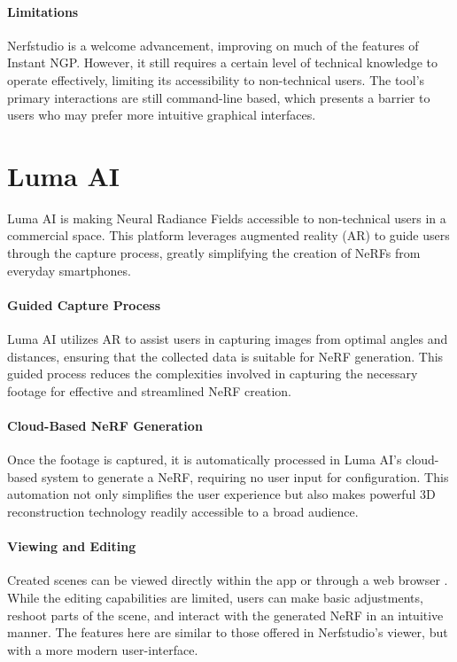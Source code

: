 \paragraph{Limitations}
Nerfstudio is a welcome advancement, improving on much of the features of Instant NGP. 
However, it still requires a certain level of technical knowledge to operate effectively, limiting its accessibility to non-technical users.
The tool's primary interactions are still command-line based, which presents a barrier to users who may prefer more intuitive graphical interfaces.

\section{Luma AI}
\label{sec:related:luma}

Luma AI \cite{noauthor_luma_nodate} is making Neural Radiance Fields accessible to non-technical users in a commercial space.
This platform leverages augmented reality (AR) to guide users through the capture process, greatly simplifying the creation of NeRFs from everyday smartphones.

\paragraph{Guided Capture Process}
Luma AI utilizes AR to assist users in capturing images from optimal angles and distances, ensuring that the collected data is suitable for NeRF generation.
This guided process reduces the complexities involved in capturing the necessary footage for effective and streamlined NeRF creation.

\paragraph{Cloud-Based NeRF Generation}
Once the footage is captured, it is automatically processed in Luma AI’s cloud-based system to generate a NeRF, requiring no user input for configuration.
This automation not only simplifies the user experience but also makes powerful 3D reconstruction technology readily accessible to a broad audience.

\paragraph{Viewing and Editing}
Created scenes can be viewed directly within the app or through a web browser . 
While the editing capabilities are limited, users can make basic adjustments, reshoot parts of the scene, and interact with the generated NeRF in an intuitive manner.
The features here are similar to those offered in Nerfstudio's viewer, but with a more modern user-interface.

